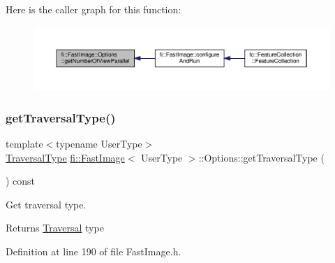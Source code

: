 Here is the caller graph for this function\+:
\nopagebreak
\begin{figure}[H]
\begin{center}
\leavevmode
\includegraphics[width=350pt]{dc/db9/classfi_1_1FastImage_1_1Options_af9e404f908cbfa016bb1774748948512_icgraph}
\end{center}
\end{figure}
\mbox{\label{classfi_1_1FastImage_1_1Options_a8f422b375446460e2200597fd064e79c}} 
\subsubsection{\texorpdfstring{get\+Traversal\+Type()}{getTraversalType()}}
{\footnotesize\ttfamily template$<$typename User\+Type$>$ \\
\hyperlink{namespacefi_a7ba5ce68668e7f273b22e5f56ca6dfcb}{Traversal\+Type} \hyperlink{classfi_1_1FastImage}{fi\+::\+Fast\+Image}$<$ User\+Type $>$\+::Options\+::get\+Traversal\+Type (\begin{DoxyParamCaption}{ }\end{DoxyParamCaption}) const\hspace{0.3cm}{\ttfamily [inline]}}



Get traversal type. 

\begin{DoxyReturn}{Returns}
\hyperlink{classfi_1_1Traversal}{Traversal} type 
\end{DoxyReturn}


Definition at line 190 of file Fast\+Image.\+h.

